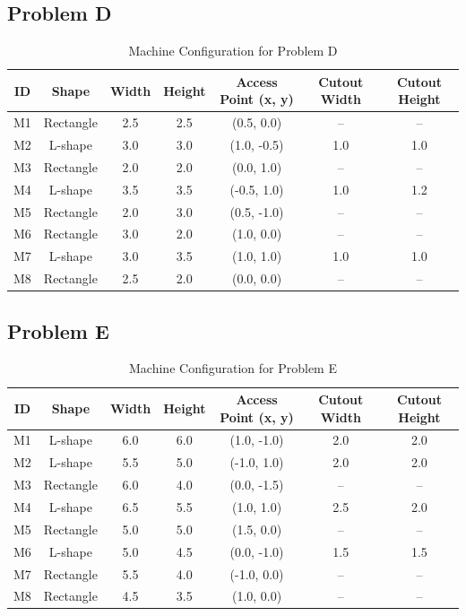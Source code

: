 \subsection{Problem D}
\begin{table}[H]
\centering
\small
\begin{tabular}{ccccccc}
\toprule
\textbf{ID} & \textbf{Shape} & \textbf{Width} & \textbf{Height} & \textbf{Access Point (x, y)} & \textbf{Cutout Width} & \textbf{Cutout Height} \\
\midrule
M1 & Rectangle & 2.5 & 2.5 & (0.5, 0.0)   & --   & --   \\
M2 & L-shape   & 3.0 & 3.0 & (1.0, -0.5)  & 1.0  & 1.0  \\
M3 & Rectangle & 2.0 & 2.0 & (0.0, 1.0)   & --   & --   \\
M4 & L-shape   & 3.5 & 3.5 & (-0.5, 1.0)  & 1.0  & 1.2  \\
M5 & Rectangle & 2.0 & 3.0 & (0.5, -1.0)  & --   & --   \\
M6 & Rectangle & 3.0 & 2.0 & (1.0, 0.0)   & --   & --   \\
M7 & L-shape   & 3.0 & 3.5 & (1.0, 1.0)   & 1.0  & 1.0  \\
M8 & Rectangle & 2.5 & 2.0 & (0.0, 0.0)   & --   & --   \\
\bottomrule
\end{tabular}
\caption{Machine Configuration for Problem D}
\label{tab:machine_config_d}
\end{table}

\subsection{Problem E}
\begin{table}[H]
\centering
\small
\begin{tabular}{ccccccc}
\toprule
\textbf{ID} & \textbf{Shape} & \textbf{Width} & \textbf{Height} & \textbf{Access Point (x, y)} & \textbf{Cutout Width} & \textbf{Cutout Height} \\
\midrule
M1 & L-shape   & 6.0 & 6.0 & (1.0, -1.0)  & 2.0  & 2.0  \\
M2 & L-shape   & 5.5 & 5.0 & (-1.0, 1.0)  & 2.0  & 2.0  \\
M3 & Rectangle & 6.0 & 4.0 & (0.0, -1.5)  & --   & --   \\
M4 & L-shape   & 6.5 & 5.5 & (1.0, 1.0)   & 2.5  & 2.0  \\
M5 & Rectangle & 5.0 & 5.0 & (1.5, 0.0)   & --   & --   \\
M6 & L-shape   & 5.0 & 4.5 & (0.0, -1.0)  & 1.5  & 1.5  \\
M7 & Rectangle & 5.5 & 4.0 & (-1.0, 0.0)  & --   & --   \\
M8 & Rectangle & 4.5 & 3.5 & (1.0, 0.0)   & --   & --   \\
\bottomrule
\end{tabular}
\caption{Machine Configuration for Problem E}
\label{tab:machine_config_e}
\end{table}

